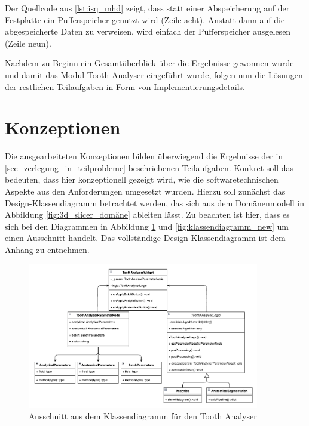 Der Quellcode aus \ref{lst:isq_mhd} zeigt, dass statt einer Abspeicherung auf
der Festplatte ein Pufferspeicher genutzt wird (Zeile acht). Anstatt dann auf die
abgespeicherte Daten zu verweisen, wird einfach der Pufferspeicher ausgelesen (Zeile
neun).

Nachdem zu Beginn ein Gesamtüberblick über die Ergebnisse gewonnen wurde und
damit das Modul Tooth Analyser eingeführt wurde, folgen nun die Lösungen der restlichen
Teilaufgaben in Form von Implementierungsdetails.

\pagebreak

\section{Konzeptionen}
\label{sec:konzeptionen} Die ausgearbeiteten Konzeptionen bilden überwiegend die
Ergebnisse der in \ref{sec_zerlegung_in_teilprobleme} beschriebenen Teilaufgaben.
Konkret soll das bedeuten, dass hier konzeptionell gezeigt wird, wie die softwaretechnischen
Aspekte aus den Anforderungen umgesetzt wurden. Hierzu soll zunächst das Design-Klassendiagramm
betrachtet werden, das sich aus dem Domänenmodell in Abbildung \ref{fig:3d_slicer_domäne}
ableiten lässt. Zu beachten ist hier, dass es sich bei den Diagrammen in Abbildung
\ref{fig:klassendiagramm} und \ref{fig:klassendiagramm_new} um einen Ausschnitt handelt.
Das vollständige Design-Klassendiagramm ist dem Anhang zu entnehmen.

\begin{figure}[h]
	\centering
	\includegraphics[width=0.9\textwidth]{
		img/tooth_analyser_class_diagram_light.png
	}
	\caption{Ausschnitt aus dem Klassendiagramm für den Tooth Analyser}
	\label{fig:klassendiagramm}
\end{figure}

